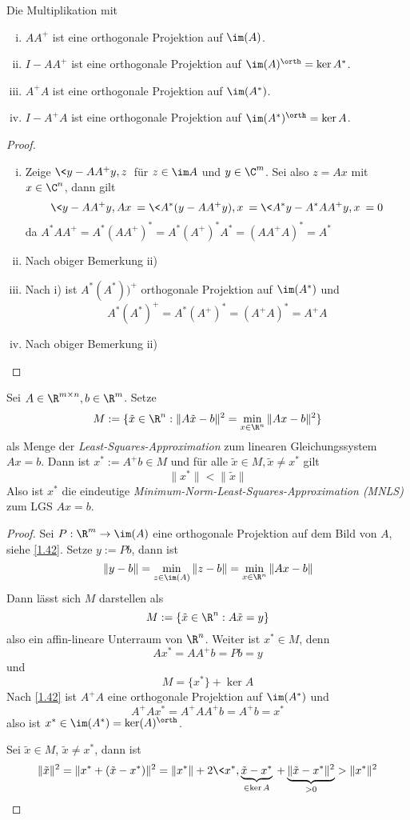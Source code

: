 \documentclass[11pt]{scrbook}
\begin{document}
\begin{lem}
	\label{1.42}
	Die Multiplikation mit
	\begin{enumerate}[i)]
		\item
			$AA^+$ ist eine orthogonale Projektion auf $\im(A)$.
		\item
			$I-AA^+$ ist eine orthogonale Projektion auf $\im (A)^\orth = \ker A^*$.
		\item
			$A^+A$ ist eine orthogonale Projektion auf $\im(A^*)$.
		\item
			$I-A^+A$ ist eine orthogonale Projektion auf $\im (A^*)^\orth = \ker A$.
	\end{enumerate}
	\begin{proof}
		\begin{enumerate}[i)]
			\item
				Zeige $\<y-AA^+y, z\>$ für $z\in \im A$ und $y\in \C^m$.
				Sei also $z=Ax$ mit $x\in \C^n$, dann gilt
				\[
					\<y-AA^+y,Ax\> = \<A^*(y-AA^+y),x\> = \<A^*y - A^*AA^+y,x\> = 0
				\]
				da $A^*AA^+ = A^*(AA^+)^* = A^*(A^+)^* A^* = (AA^+A)^* = A^*$
			\item
				Nach obiger Bemerkung ii)
			\item
				Nach i) ist $A^*(A^*))^+$ orthogonale Projektion auf $\im (A^*)$ und
				\[
					A^*(A^*)^+ = A^*(A^+)^* = (A^+A)^* = A^+A
				\]
			\item
				Nach obiger Bemerkung ii)
		\end{enumerate}
	\end{proof}
\end{lem}

\begin{st}
	\label{1.43}
	Sei $A\in \R^{m\times n}, b\in \R^m$.
	Setze
	\[
		M := \{ \tilde x\in \R^n : \|A\tilde x-b\|^2 = \min_{x\in \R^n}\|Ax-b\|^2\}
	\]
	als Menge der \emph{Least-Squares-Approximation} zum linearen Gleichungssystem $Ax=b$.
	Dann ist $x^* := A^+b \in M$ und für alle $\tilde x\in M, \tilde x \neq x^*$ gilt
	\[
		\|x^*\| < \| \tilde x \|
	\]
	Also ist $x^*$ die eindeutige \emph{Minimum-Norm-Least-Squares-Approximation (MNLS)} zum LGS $Ax=b$.
	\begin{proof}
		Sei $P: \R^m \to \im(A)$ eine orthogonale Projektion auf dem Bild von $A$, siehe \ref{1.42}.
		Setze $y:= Pb$, dann ist
		\[
			\|y-b\| = \min_{z\in \im(A)}\|z-b\| = \min_{x\in \R^n}\|Ax-b\|
		\]
		Dann lässt sich $M$ darstellen als
		\[
			M := \{ \tilde x \in \R^n : A\tilde x = y\}
		\]
		also ein affin-lineare Unterraum von $\R^n$.
		Weiter ist $x^* \in M$, denn 
		\[
			Ax^* = AA^+ b = Pb = y
		\]
		und
		\[
			M = \{x^*\} + \ker A
		\]
		Nach \ref{1.42} ist $A^+A$ eine orthogonale Projektion auf $\im(A^*)$ und 
		\[
			A^+Ax^* = A^+AA^+ b = A^+b = x^*
		\]
		also ist $x^* \in \im (A^*) = \ker( A)^\orth$.

		Sei $\tilde x \in M$, $\tilde x \neq x^*$, dann ist
		\[
			\|\tilde x\|^2 = \|x^* + (\tilde x - x^*)\|^2 = \|x^*\| + 2\< x^*,\underbrace{\tilde x - x^*}_{\in \ker A}\> + \underbrace{\|\tilde x - x^*\|^2}_{>0} > \|x^*\|^2
		\]
	\end{proof}
\end{st}
\end{document}
